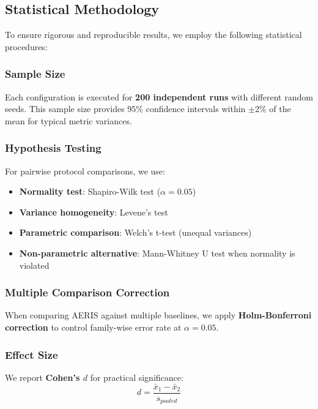 \subsection{Statistical Methodology}

To ensure rigorous and reproducible results, we employ the following
statistical procedures:

\subsubsection{Sample Size}

Each configuration is executed for \textbf{200 independent runs} with
different random seeds. This sample size provides 95\% confidence intervals
within $\pm$2\% of the mean for typical metric variances.

\subsubsection{Hypothesis Testing}

For pairwise protocol comparisons, we use:
\begin{itemize}
    \item \textbf{Normality test}: Shapiro-Wilk test ($\alpha = 0.05$)
    \item \textbf{Variance homogeneity}: Levene's test
    \item \textbf{Parametric comparison}: Welch's t-test (unequal variances)
    \item \textbf{Non-parametric alternative}: Mann-Whitney U test when
    normality is violated
\end{itemize}

\subsubsection{Multiple Comparison Correction}

When comparing AERIS against multiple baselines, we apply
\textbf{Holm-Bonferroni correction} to control family-wise error rate
at $\alpha = 0.05$.

\subsubsection{Effect Size}

We report \textbf{Cohen's $d$} for practical significance:
\begin{equation}
d = \frac{\bar{x}_1 - \bar{x}_2}{s_{pooled}}
\label{eq:cohens_d}
\end{equation}

